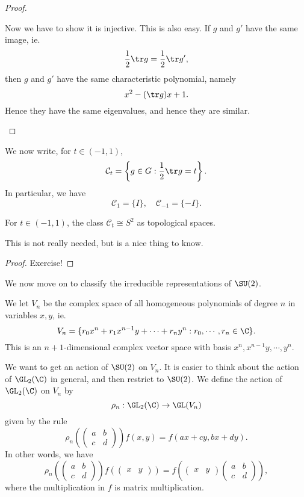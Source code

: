 \documentclass[a4paper]{article}
\begin{document}
\begin{proof}
\begin{enumerate}
      Now we have to show it is injective. This is also easy. If $g$ and $g'$ have the same image, ie.
      \[
        \frac{1}{2} \tr g = \frac{1}{2} \tr g',
      \]
      then $g$ and $g'$ have the same characteristic polynomial, namely
      \[
        x^2 - (\tr g)x + 1.
      \]
      Hence they have the same eigenvalues, and hence they are similar.
  \end{enumerate}
\end{proof}

We now write, for $t \in (-1, 1)$,
\[
  \mathcal{C}_t = \left\{g \in G: \frac{1}{2} \tr g = t\right\}.
\]
In particular, we have
\[
  \mathcal{C}_1 = \{I\}, \quad \mathcal{C}_{-1} = \{-I\}.
\]
\begin{prop}
  For $t \in (-1, 1)$, the class $\mathcal{C}_t \cong S^2$ as topological spaces.
\end{prop}
This is not really needed, but is a nice thing to know.
\begin{proof}
  Exercise! %
\end{proof}

We now move on to classify the irreducible representations of $\SU(2)$.

We let $V_n$ be the complex space of all homogeneous polynomials of degree $n$ in variables $x, y$, ie.
\[
  V_n = \{r_0 x^n + r_1 x^{n - 1}y + \cdots + r_n y^n: r_0, \cdots, r_n \in \C\}.
\]
This is an $n + 1$-dimensional complex vector space with basis $x^n, x^{n - 1}y, \cdots, y^n$.

We want to get an action of $\SU(2)$ on $V_n$. It is easier to think about the action of $\GL_2(\C)$ in general, and then restrict to $\SU(2)$. We define the action of $\GL_2(\C)$ on $V_n$ by
\[
  \rho_n: \GL_2(\C) \to \GL(V_n)
\]
given by the rule
\[
  \rho_n\left(
  \begin{pmatrix}
    a & b\\
    c & d
  \end{pmatrix}\right) f(x, y) = f(ax + cy, bx + dy).
\]
In other words, we have
\[
  \rho_n\left(
  \begin{pmatrix}
    a & b\\
    c & d
  \end{pmatrix}\right) f\left(
  \begin{pmatrix}
    x & y
  \end{pmatrix}\right) = f\left(
  \begin{pmatrix}
    x & y
  \end{pmatrix}
  \begin{pmatrix}
    a & b\\
    c & d
  \end{pmatrix}\right),
\]
where the multiplication in $f$ is matrix multiplication.
\end{document}
